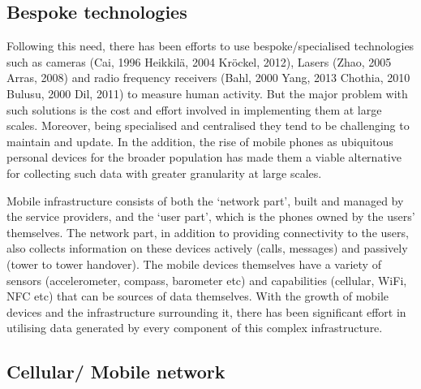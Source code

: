 \subsection{Bespoke technologies}

Following this need, there has been efforts to use bespoke/specialised technologies such as cameras (Cai, 1996 Heikkilä, 2004 Kröckel, 2012), Lasers (Zhao, 2005 Arras, 2008) and radio frequency receivers  (Bahl, 2000 Yang, 2013 Chothia, 2010 Bulusu, 2000 Dil, 2011) to measure human activity.
But the major problem with such solutions is the cost and effort involved in implementing them at large scales.
Moreover, being specialised and centralised they tend to be challenging to maintain and update.
In the addition, the rise of mobile phones as ubiquitous personal devices for the broader population has made them a viable alternative for collecting such data with greater granularity at large scales.

Mobile infrastructure consists of both the ‘network part’, built and managed by the service providers, and the ‘user part’, which is the phones owned by the users’ themselves.
The network part, in addition to providing connectivity to the users, also collects information on these devices actively (calls, messages) and passively (tower to tower handover).
The mobile devices themselves have a variety of sensors (accelerometer, compass, barometer etc) and capabilities (cellular, WiFi, NFC etc) that can be sources of data themselves.
With the growth of mobile devices and the infrastructure surrounding it, there has been significant effort in utilising data generated by every component of this complex infrastructure.

\subsection{Cellular/ Mobile network}

